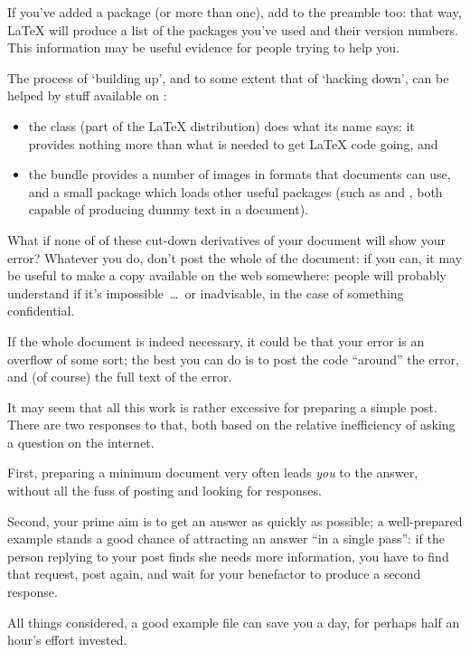 If you've added a package (or more than one), add  to
the preamble too: that way, \LaTeX{} will produce a list of the
packages you've used and their version numbers.  This information may
be useful evidence for people trying to help you.

The process of `building up', and to some extent that of `hacking
down', can be helped by stuff available on :
\begin{itemize}
\item the  class (part of the \LaTeX{} distribution)
  does what its name says: it provides nothing more than what is
  needed to get \LaTeX{} code going, and
\item the  bundle provides a number of images in formats
  that \alltex{} documents can use, and a small package 
  which loads other useful packages (such as  and
  , both capable of producing dummy text in a
  document).
\end{itemize}

What if none of of these cut-down derivatives of your document will
show your error?  Whatever you do, don't post the whole of the document: if
you can, it may be useful to make a copy available on the web
somewhere: people will probably understand if it's impossible~\dots{}\ 
or inadvisable, in the case of something confidential.

If the whole document is indeed necessary, it could be that your
error is an overflow of some sort; the best you can do is to post the
code ``around'' the error, and (of course) the full text of the error.

It may seem that all this work is rather excessive for preparing a
simple post.  There are two responses to that, both based on the
relative inefficiency of asking a question on the internet.

First, preparing a minimum document very often leads \emph{you} to the
answer, without all the fuss of posting and looking for responses.

Second, your prime aim is to get an answer as quickly as possible; a
well-prepared example stands a good chance of attracting an answer
``in a single pass'': if the person replying to your post finds she
needs more information, you have to find that request, post again, and
wait for your benefactor to produce a second response.

All things considered, a good example file can save you a day, for
perhaps half an hour's effort invested.

